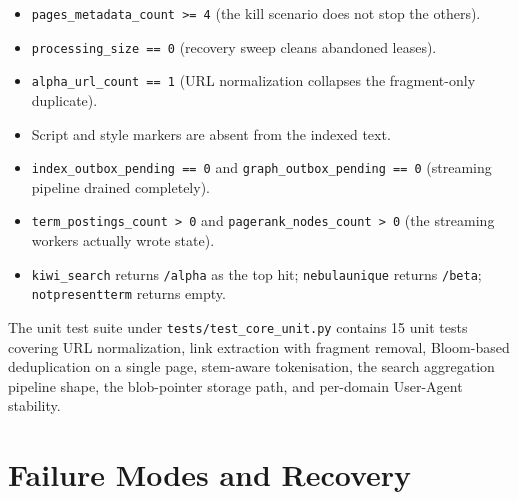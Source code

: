 \documentclass[11pt,a4paper]{article}
\newcommand{\code}[1]{\texttt{#1}}
\begin{document}
\begin{itemize}[leftmargin=1.4em]
  \item \code{pages\_metadata\_count >= 4} (the kill scenario does not stop the others).
  \item \code{processing\_size == 0} (recovery sweep cleans abandoned leases).
  \item \code{alpha\_url\_count == 1} (URL normalization collapses the fragment-only duplicate).
  \item Script and style markers are absent from the indexed text.
  \item \code{index\_outbox\_pending == 0} and \code{graph\_outbox\_pending == 0} (streaming pipeline drained completely).
  \item \code{term\_postings\_count > 0} and \code{pagerank\_nodes\_count > 0} (the streaming workers actually wrote state).
  \item \code{kiwi\_search} returns \code{/alpha} as the top hit; \code{nebulaunique} returns \code{/beta}; \code{notpresentterm} returns empty.
\end{itemize}

The unit test suite under \code{tests/test\_core\_unit.py} contains 15 unit tests covering URL normalization, link extraction with fragment removal, Bloom-based deduplication on a single page, stem-aware tokenisation, the search aggregation pipeline shape, the blob-pointer storage path, and per-domain User-Agent stability.

\section{Failure Modes and Recovery}
\end{document}
